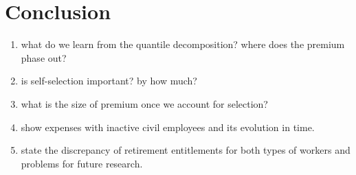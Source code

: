 \documentclass{article}
\begin{document}
\section{Conclusion}
 \begin{enumerate}
     \item what do we learn from the quantile decomposition? where does the premium phase out?
     \item is self-selection important? by how much?
     \item what is the size of premium once we account for selection?
     \item show expenses with inactive civil employees and its evolution in time.
     \item state the discrepancy of retirement entitlements for both types of workers and problems for future research. 
\end{enumerate}  


\newpage
\scriptsize{}
\end{document}
